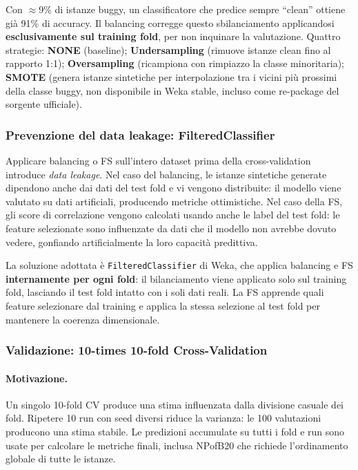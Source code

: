 Con $\approx$9\% di istanze buggy, un classificatore che predice sempre ``clean'' ottiene
già 91\% di accuracy. Il balancing corregge questo sbilanciamento applicandosi
\textbf{esclusivamente sul training fold}, per non inquinare la valutazione. Quattro
strategie: \textbf{NONE} (baseline); \textbf{Undersampling} (rimuove istanze clean fino
al rapporto 1:1); \textbf{Oversampling} (ricampiona con rimpiazzo la classe minoritaria);
\textbf{SMOTE} (genera istanze sintetiche per interpolazione tra i vicini più prossimi
della classe buggy, non disponibile in Weka stable, incluso come re-package del
sorgente ufficiale).

\subsubsection{Prevenzione del data leakage: FilteredClassifier}

Applicare balancing o FS sull'intero dataset prima della cross-validation introduce
\textit{data leakage}. Nel caso del balancing, le istanze sintetiche generate dipendono
anche dai dati del test fold e vi vengono distribuite: il modello viene valutato su dati
artificiali, producendo metriche ottimistiche. Nel caso della FS, gli score di correlazione
vengono calcolati usando anche le label del test fold: le feature selezionate sono
influenzate da dati che il modello non avrebbe dovuto vedere, gonfiando artificialmente
la loro capacità predittiva.

La soluzione adottata è \texttt{FilteredClassifier} di Weka, che applica balancing e FS
\textbf{internamente per ogni fold}: il bilanciamento viene applicato solo sul training
fold, lasciando il test fold intatto con i soli dati reali. La FS apprende quali feature
selezionare dal training e applica la stessa selezione al test fold per mantenere la
coerenza dimensionale.

\subsubsection{Validazione: 10-times 10-fold Cross-Validation}

\paragraph{Motivazione.}
Un singolo 10-fold CV produce una stima influenzata dalla divisione casuale dei fold.
Ripetere 10 run con seed diversi riduce la varianza: le 100 valutazioni producono una
stima stabile. Le predizioni accumulate su tutti i fold e run sono usate per calcolare
le metriche finali, inclusa NPofB20 che richiede l'ordinamento globale di tutte le istanze.

